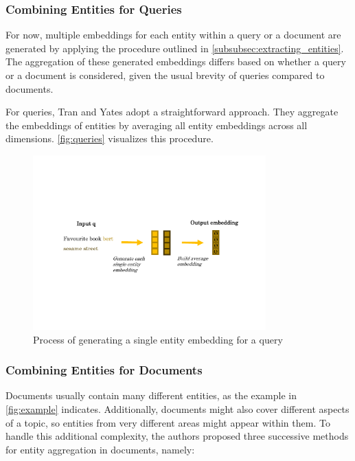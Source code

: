 \subsubsection{Combining Entities for Queries}\label{subsub:generating_queries}

For now, multiple embeddings for each entity within a query or a document are generated by applying the procedure outlined in \autoref{subsubsec:extracting_entities}. The aggregation of these generated embeddings differs based on whether a query or a document is considered, given the usual brevity of queries compared to documents.

For queries, Tran and Yates adopt a straightforward approach. They aggregate the embeddings of entities by averaging all entity embeddings across all dimensions. \autoref{fig:queries} visualizes this procedure.

\begin{figure}[!htb]
    \centering
    \includegraphics[trim={2cm 6cm 2cm 6cm}, clip, width=0.8\textwidth]{resources/queries} 
    \caption{Process of generating a single entity embedding for a query}
    \label{fig:queries}
\end{figure}

\subsubsection{Combining Entities for Documents}\label{subsec:models}

Documents usually contain many different entities, as the example in \autoref{fig:example} indicates. Additionally, documents might also cover different aspects of a topic, so entities from very different areas might appear within them. To handle this additional complexity, the authors proposed three successive methods for entity aggregation in documents, namely:

